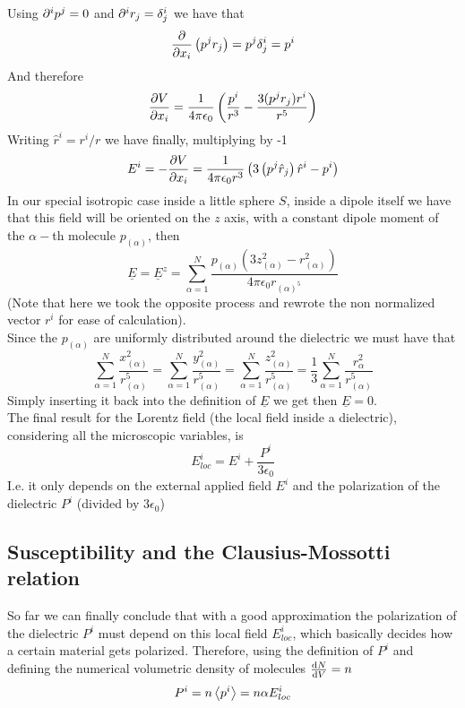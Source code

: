 \documentclass[../electromagnetism]{subfiles}
\begin{document}
Using $\partial^ip^j=0$ and $\partial^ir_j=\delta^i_j$ we have that
\begin{equation*}
	\pdv{x_i}\left( p^jr_j \right)=p^j\delta^i_j=p^i
\end{equation*}
And therefore
\begin{equation*}
	\pdv{V}{x_i}=\frac{1}{4\pi\epsilon_0}\left( \frac{p^i}{r^3}-\frac{3(p^jr_j)r^i}{r^5} \right)
\end{equation*}
Writing $\hat{r}^i=r^i/r$ we have finally, multiplying by -1
\begin{equation}
	E^i=-\pdv{V}{x_i}=\frac{1}{4\pi\epsilon_0r^3}\left( 3\left( p^j\hat{r}_j \right)\hat{r}^i-p^i \right)
	\label{eq:efielddipole}
\end{equation}
In our special isotropic case inside a little sphere $S$, inside a dipole itself we have that this field will be oriented on the $z$ axis, with a constant dipole moment of the $\alpha-$th molecule $p_{(\alpha)}$, then
\begin{equation}
	\underline{E}=\underline{E}^z=\sum_{\alpha=1}^N\frac{p_{(\alpha)}\left( 3z_{(\alpha)}^2-r^2_{(\alpha)}\right)}{4\pi\epsilon_0 r_{(\alpha)^5}}
	\label{eq:efieldunderbar}
\end{equation}
(Note that here we took the opposite process and rewrote the non normalized vector $r^i$ for ease of calculation).\\
Since the $p_{(\alpha)}$ are uniformly distributed around the dielectric we must have that
\begin{equation}
	\sum_{\alpha=1}^N\frac{x^2_{(\alpha)}}{r^5_{(\alpha)}}=\sum_{\alpha=1}^N\frac{y^2_{(\alpha)}}{r^5_{(\alpha)}}=\sum_{\alpha=1}^N\frac{z^2_{(\alpha)}}{r_{(\alpha)}^5}=\frac{1}{3}\sum_{\alpha=1}^N\frac{r^2_{\alpha}}{r^5_{(\alpha)}}
	\label{eq:omogeneitycondlorentzfield}
\end{equation}
Simply inserting it back into the definition of $\underline{E}$ we get then $\underline{E}=0$.\\
The final result for the Lorentz field (the local field inside a dielectric), considering all the microscopic variables, is
\begin{equation}
	E^i_{loc}=E^i+\frac{P^i}{3\epsilon_0}
	\label{eq:lorentzfield}
\end{equation}
I.e. it only depends on the external applied field $E^i$ and the polarization of the dielectric $P^i$ (divided by $3\epsilon_0$)
\subsection{Susceptibility and the Clausius-Mossotti relation}
So far we can finally conclude that with a good approximation the polarization of the dielectric $P^i$ must depend on this local field $E^i_{loc}$, which basically decides how a certain material gets polarized. Therefore, using the definition of $P^i$ and defining the numerical volumetric density of molecules $\dv{N}{V}=n$
\begin{equation}
	P^i=n\expval{p^i}=n\alpha E^i_{loc}
	\label{eq:polarizationfieldalmostcomp}
\end{equation}
\end{document}
